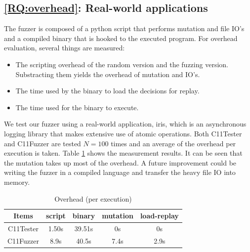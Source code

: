 \subsection{\ref*{RQ:overhead}: Real-world applications}

The fuzzer is composed of a python script that performs mutation and file IO's and a compiled binary that is hooked to the executed program. For overhead evaluation, several things are measured:
\begin{itemize}
	\item The scripting overhead of the random version and the fuzzing version. Substracting them yields the overhead of mutation and IO's.
	\item The time used by the binary to load the decisions for replay.
	\item The time used for the binary to execute.
\end{itemize}

We test our fuzzer using a real-world application, iris, which is an asynchronous logging library that makes extensive use of atomic operations. Both C11Tester and C11Fuzzer are tested $N=100$ times and an average of the overhead per execution is taken. Table \ref{overhead} shows the measurement results. It can be seen that the mutation takes up most of the overhead. A future improvement could be writing the fuzzer in a compiled language and transfer the heavy file IO into memory.

\begin{table}[h!]
	\centering
	\begin{tabular}{ |c|cccc| }
		\hline
		Items     & script & binary & mutation & load-replay \\
		\hline
		C11Tester & 1.50s  & 39.51s & 0s       & 0s          \\
		C11Fuzzer & 8.9s   & 40.5s  & 7.4s     & 2.9s        \\
		\hline
	\end{tabular}
	\caption{Overhead (per execution)}
	\label{overhead}
\end{table}



